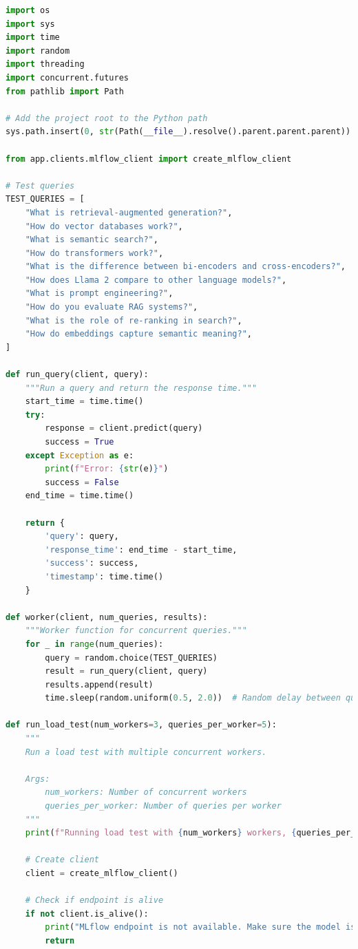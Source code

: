 \documentclass[
  screen,review,acmlarge]{acmart}
\begin{document}
\begin{lstlisting}[language=Python]
import os
import sys
import time
import random
import threading
import concurrent.futures
from pathlib import Path

# Add the project root to the Python path
sys.path.insert(0, str(Path(__file__).resolve().parent.parent.parent))

from app.clients.mlflow_client import create_mlflow_client

# Test queries
TEST_QUERIES = [
    "What is retrieval-augmented generation?",
    "How do vector databases work?",
    "What is semantic search?",
    "How do transformers work?",
    "What is the difference between bi-encoders and cross-encoders?",
    "How does Llama 2 compare to other language models?",
    "What is prompt engineering?",
    "How do you evaluate RAG systems?",
    "What is the role of re-ranking in search?",
    "How do embeddings capture semantic meaning?",
]

def run_query(client, query):
    """Run a query and return the response time."""
    start_time = time.time()
    try:
        response = client.predict(query)
        success = True
    except Exception as e:
        print(f"Error: {str(e)}")
        success = False
    end_time = time.time()
    
    return {
        'query': query,
        'response_time': end_time - start_time,
        'success': success,
        'timestamp': time.time()
    }

def worker(client, num_queries, results):
    """Worker function for concurrent queries."""
    for _ in range(num_queries):
        query = random.choice(TEST_QUERIES)
        result = run_query(client, query)
        results.append(result)
        time.sleep(random.uniform(0.5, 2.0))  # Random delay between queries

def run_load_test(num_workers=3, queries_per_worker=5):
    """
    Run a load test with multiple concurrent workers.
    
    Args:
        num_workers: Number of concurrent workers
        queries_per_worker: Number of queries per worker
    """
    print(f"Running load test with {num_workers} workers, {queries_per_worker} queries per worker")
    
    # Create client
    client = create_mlflow_client()
    
    # Check if endpoint is alive
    if not client.is_alive():
        print("MLflow endpoint is not available. Make sure the model is deployed.")
        return
    

\end{lstlisting}
\end{document}
